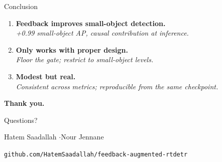 \documentclass[aspectratio=169,11pt]{beamer}
\begin{document}
\begin{frame}{Conclusion}
    \begin{enumerate}\setlength\itemsep{1em}
        \item \textbf{Feedback improves small-object detection.}\\
              {\itshape\color{Light}+0.99 small-object AP, causal contribution at inference.}

        \item \textbf{Only works with proper design.}\\
              {\itshape\color{Light}Floor the gate; restrict to small-object levels.}

        \item \textbf{Modest but real.}\\
              {\itshape\color{Light}Consistent across metrics; reproducible from the same checkpoint.}
    \end{enumerate}
\end{frame}

\begin{frame}[plain]
    \vspace*{1.5cm}
    \begin{center}
        {\fontsize{56}{56}\selectfont\bfseries Thank you.}

        \vspace{1em}
        {\Large\color{Navy}Questions?}

        \vspace{2.5em}
        {\small Hatem Saadallah \quad$\cdot$\quad Nour Jennane}

        \vspace{0.5em}
        {\footnotesize\color{Light}\texttt{github.com/HatemSaadallah/feedback-augmented-rtdetr}}
    \end{center}
\end{frame}
\end{document}
